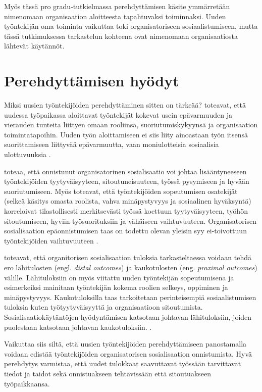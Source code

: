 \documentclass[utf8]{gradu3}
\begin{document}
Myös tässä pro gradu-tutkielmassa perehdyttämisen käsite ymmärretään nimenomaan organisaation aloitteesta tapahtuvaksi toiminnaksi. Uuden työntekijän oma toiminta vaikuttaa toki organisatoriseen sosiaalistumiseen, mutta tässä tutkimuksessa tarkastelun kohteena ovat nimenomaan organisaatiosta lähtevät käytännöt.

\section{Perehdyttämisen hyödyt}
\label{luku-perehdyttämisen-hyödyt}

Miksi uusien työntekijöiden perehdyttäminen sitten on tärkeää? \textcite{saks-gruman-2012} toteavat, että uudessa työpaikassa aloittavat työntekijät kokevat usein epävarmuuden ja vierauden tunteita liittyen omaan rooliinsa, suoriutumiskykyynsä ja organisaation toimintatapoihin. Uuden työn aloittamiseen ei siis liity ainoastaan työn itsensä suorittamiseen liittyvää epävarmuutta, vaan moniulotteisia sosiaalisia ulottuvuuksia \parencite{saks-gruman-2012}. 

\textcite{wanberg-2012} toteaa, että onnistunut organisatorinen sosialisaatio voi johtaa lisääntyneeseen työntekijöiden tyytyväisyyteen, sitoutuneisuuteen, työssä pysymiseen ja hyvään suoriutumiseen. Myös \textcite{bauer-ym-2007} toteavat, että työntekijöiden sopeutumisen osatekijät (selkeä käsitys omasta roolista, vahva minäpystyvyys ja sosiaalinen hyväksyntä) korreloivat tilastollisesti merkitsevästi työssä koettuun tyytyväisyyteen, työhön sitoutumiseen, hyviin työsuorituksiin ja vähäiseen vaihtuvuuteen. Organisatorisen sosialisaation epäonnistumisen taas on todettu olevan yleisin syy ei-toivottuun työntekijöiden vaihtuvuuteen \parencite{bauer-ym-1998}.

\textcite{saks-gruman-2012} toteavat, että organitorisen sosialisaation tuloksia tarkasteltaessa voidaan tehdä ero lähitulosten (engl. \textit{distal outcomes}) ja kaukotulosten (eng. \textit{proximal outcomes}) välille. Lähituloksiin on myös viitattu uuden työntekijän sopeutumisena ja esimerkeiksi mainitaan työntekijän kokema roolien selkeys, oppiminen ja minäpystyvyys. Kaukotuloksilla taas tarkoitetaan perinteisempiä sosiaalistumisen tuloksia kuten työtyytyväisyyttä ja organisaatioon sitoutumista. Sosialisaatiokäytäntöjen hyödyntämisen katsotaan johtavan lähituloksiin, joiden puolestaan katsotaan johtavan kaukotuloksiin. \parencite{saks-gruman-2012}.

Vaikuttaa siis siltä, että uusien työntekijöiden perehdyttämiseen panostamalla voidaan edistää työntekijöiden organisatorisen sosialisaation onnistumista. Hyvä perehdytys varmistaa, että uudet tulokkaat saavuttavat työssään tarvittavat tiedot ja taidot sekä onnistuakseen tehtävissään että sitoutuakseen työpaikkaansa.
\end{document}
